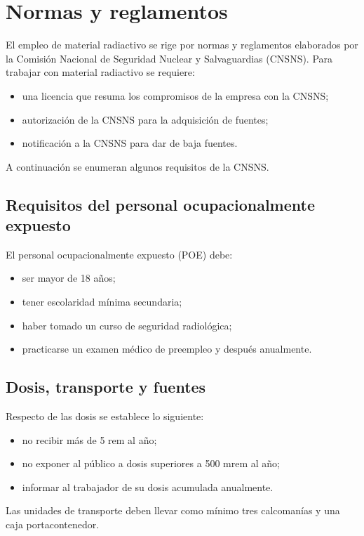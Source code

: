 \chapter{Normas y reglamentos}

El empleo de material radiactivo se rige por normas y reglamentos elaborados por la Comisión Nacional de Seguridad Nuclear y Salvaguardias (CNSNS). Para trabajar con material radiactivo se requiere:
\begin{itemize}
  \item una licencia que resuma los compromisos de la empresa con la CNSNS;
  \item autorización de la CNSNS para la adquisición de fuentes;
  \item notificación a la CNSNS para dar de baja fuentes.
\end{itemize}

A continuación se enumeran algunos requisitos de la CNSNS.

\section{Requisitos del personal ocupacionalmente expuesto}

El personal ocupacionalmente expuesto (POE) debe:
\begin{itemize}
  \item ser mayor de 18 años;
  \item tener escolaridad mínima secundaria;
  \item haber tomado un curso de seguridad radiológica;
  \item practicarse un examen médico de preempleo y después anualmente.
\end{itemize}

\section{Dosis, transporte y fuentes}

Respecto de las dosis se establece lo siguiente:
\begin{itemize}
  \item no recibir más de 5 rem al año;
  \item no exponer al público a dosis superiores a 500 mrem al año;
  \item informar al trabajador de su dosis acumulada anualmente.
\end{itemize}

Las unidades de transporte deben llevar como mínimo tres calcomanías y una caja portacontenedor.


